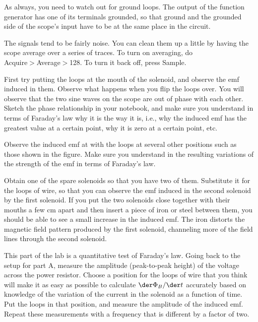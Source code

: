 As always, you need to watch out for ground loops. The output
of the function generator has one of its terminals grounded,
so that ground and the grounded side of the scope's input have
to be at the same place in the circuit.

The signals tend to be fairly noise. You can clean them up
a little by having the scope average over a series of traces.
To turn on averaging, do\\
 Acquire$>$Average$>$128. To turn it back
off, press Sample.

First try putting the loops at the mouth of the solenoid,
and observe the emf induced in them. Observe what happens
when you flip the loops over. You will observe that the two
sine waves on the scope are out of phase with each other.
Sketch the phase relationship in your notebook, and make
sure you understand in terms of Faraday's law why it is the
way it is, i.e., why the induced emf has the greatest value
at a certain point, why it is zero at a certain point, etc.

Observe the induced emf at with the loops at several other
positions such as those shown in the figure. Make sure you
understand in the resulting variations of the strength of
the emf in terms of Faraday's law.


Obtain one of the spare solenoids so that you have two of
them. Substitute it for the loops of wire, so that you can
observe the emf induced in the second solenoid by the first
solenoid. If you put the two solenoids close together with
their mouths a few cm apart and then insert a piece of iron
or steel between them, you should be able to see a small
increase in the induced emf. The iron distorts the magnetic
field pattern produced by the first solenoid, channeling
more of the field lines through the second solenoid.


This part of the lab is a quantitative test of Faraday's
law. Going back to the setup for part A, measure the
amplitude (peak-to-peak height) of the voltage across the
power resistor. Choose a position for the loops of wire that
you think will make it as easy as possible to calculate $\der \Phi_B/\der t$
accurately based on knowledge of the variation of the
current in the solenoid as a function of time. Put the loops
in that position, and measure the amplitude of the induced
emf. Repeat these measurements with a frequency that
is different by a factor of two.

